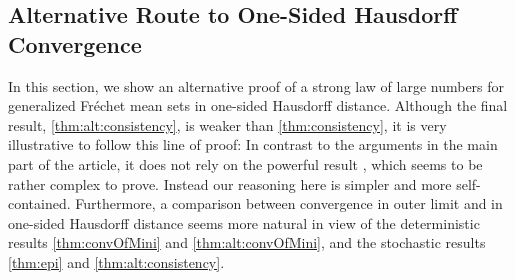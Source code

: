 \documentclass{scrartcl}
\theoremstyle{plain}\newtheorem{theorem}{Theorem}[section]
\theoremstyle{definition}
\theoremstyle{remark}
\begin{document}
\begin{appendix}
 \section{Alternative Route to One-Sided Hausdorff Convergence}\label{sec:alt}
In this section, we show an alternative proof of a strong law of large numbers for generalized Fréchet mean sets in one-sided Hausdorff distance. Although the final result, \autoref{thm:alt:consistency}, is weaker than \autoref{thm:consistency}, it is very illustrative to follow this line of proof:
In contrast to the arguments in the main part of the article, it does not rely on the powerful result \cite[Theorem 1.1]{korf01}, which seems to be rather complex to prove. Instead our reasoning here is simpler and more self-contained.
Furthermore, a comparison between convergence in outer limit and in one-sided Hausdorff distance seems more natural in view of the deterministic results \autoref{thm:convOfMini} and \autoref{thm:alt:convOfMini}, and the stochastic results \autoref{thm:epi} and \autoref{thm:alt:consistency}.

\end{appendix}
\end{document}
